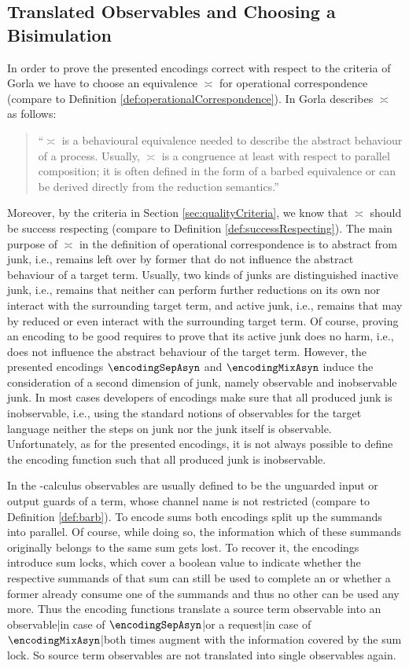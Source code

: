 \documentclass[]{llncs}
\begin{document}
\subsection{Translated Observables and Choosing a Bisimulation} \label{sec:transBarbBisim}

In order to prove the presented encodings correct with respect to the criteria of Gorla we have to choose an equivalence $ \asymp $ for operational correspondence (compare to Definition \ref{def:operationalCorrespondence}). In \cite{gorla10} Gorla describes $ \asymp $ as follows:
\begin{quotation}
	``$ \asymp $ is a behavioural equivalence needed to describe the abstract behaviour of a process. Usually, $ \asymp $ is a congruence at least with respect to parallel composition; it is often defined in the form of a barbed equivalence or can be derived directly from the reduction semantics.''
\end{quotation}
Moreover, by the criteria in Section \ref{sec:qualityCriteria}, we know that $ \asymp $ should be success respecting (compare to Definition \ref{def:successRespecting}). The main purpose of $ \asymp $ in the definition of operational correspondence is to abstract from junk, i.e., remains left over by former \simulations that do not influence the abstract behaviour of a target term. Usually, two kinds of junks are distinguished inactive junk, i.e., remains that neither can perform further reductions on its own nor interact with the surrounding target term, and active junk, i.e., remains that may by reduced or even interact with the surrounding target term. Of course, proving an encoding to be good requires to prove that its active junk does no harm, i.e., does not influence the abstract behaviour of the target term. However, the presented encodings $ \encodingSepAsyn $ and $ \encodingMixAsyn $ induce the consideration of a second dimension of junk, namely observable and inobservable junk. In most cases developers of encodings make sure that all produced junk is inobservable, i.e., using the standard notions of observables for the target language neither the steps on junk nor the junk itself is observable. Unfortunately, as for the presented encodings, it is not always possible to define the encoding function such that all produced junk is inobservable.

In the \piCal-calculus observables are usually defined to be the unguarded input or output guards of a term, whose channel name is not restricted (compare to Definition \ref{def:barb}). To encode sums both encodings split up the summands into parallel. Of course, while doing so, the information which of these summands originally belongs to the same sum gets lost. To recover it, the encodings introduce sum locks, which cover a boolean value to indicate whether the respective summands of that sum can still be used to complete an \simulation or whether a former \simulation already consume one of the summands and thus no other can be used any more. Thus the encoding functions translate a source term observable into an observable|in case of $ \encodingSepAsyn $|or a request|in case of $ \encodingMixAsyn $|both times augment with the information covered by the sum lock. So source term observables are not translated into single observables again.
\end{document}
